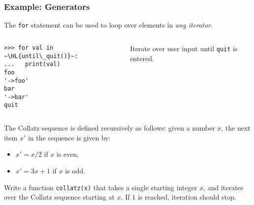 \documentclass[english,serif,mathserif,xcolor=pdftex,dvipsnames,table]{beamer}
\begin{document}
\begin{frame}[fragile]
  \frametitle{Example: Generators}
  The \texttt{for} statement can be used to loop over elements in \emph{any iterator}.

  \+
  \begin{columns}[c]
    \begin{column}{0.5\textwidth}
\begin{lstlisting}
>>> for val in ~\HL{until\_quit()}~:
...   print(val)
foo
'->foo'
bar
'->bar'
quit
\end{lstlisting}
    \end{column}
    \begin{column}{0.4\textwidth}
      \raggedleft
      Iterate over user input until \texttt{quit} is entered.
    \end{column}
  \end{columns}
\end{frame}


\begin{frame}[fragile]
  \begin{exercise*}[3.F]
    The Collatz sequence is defined recursively as follows: given a
    number $x$, the next item $x'$ in the sequence is given by:
    \begin{itemize}
    \item $x' = x/2$ if $x$ is even,
    \item $x' = 3x + 1$ if $x$ is odd.
    \end{itemize}

    \+ Write a function \texttt{collatz(x)} that takes a single starting
    integer $x$, and iterates over the Collatz sequence starting at
    $x$.  If $1$ is reached, iteration should stop.
  \end{exercise*}
\end{frame}



\end{document}
